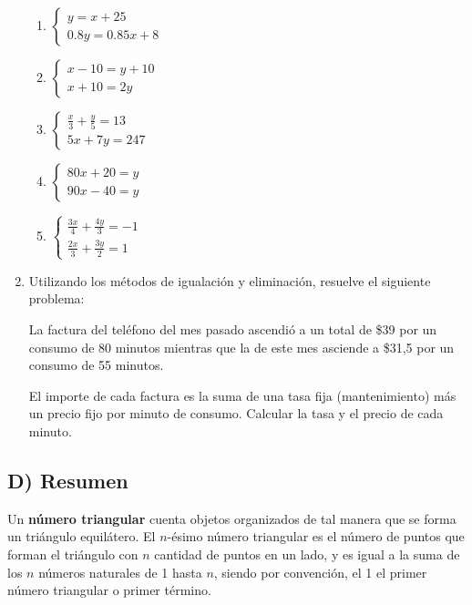 \documentclass[12pt,a4paper]{article}
\begin{document}
\begin{enumerate}
\begin{enumerate}[label=\alph*.]
        \item $\begin{cases} y = x + 25 \\ 0.8y = 0.85x + 8 \end{cases}$

        \item $\begin{cases} x - 10 = y + 10 \\ x + 10 = 2y \end{cases}$

        \item $\begin{cases} \frac{x}{3} + \frac{y}{5} = 13 \\ 5x + 7y = 247 \end{cases}$

        \item $\begin{cases} 80x + 20 = y \\ 90x - 40 = y \end{cases}$

        \item $\begin{cases} \frac{3x}{4} + \frac{4y}{3} = -1 \\ \frac{2x}{3} + \frac{3y}{2} = 1 \end{cases}$
    \end{enumerate}

    \item Utilizando los métodos de igualación y eliminación, resuelve el siguiente problema:

    La factura del teléfono del mes pasado ascendió a un total de \$39 por un consumo de 80 minutos mientras que la de este mes asciende a \$31,5 por un consumo de 55 minutos.

    El importe de cada factura es la suma de una tasa fija (mantenimiento) más un precio fijo por minuto de consumo. Calcular la tasa y el precio de cada minuto.
\end{enumerate}

\vspace{1.5cm}

\subsection*{D) Resumen}

Un \textbf{número triangular} cuenta objetos organizados de tal manera que se forma un triángulo equilátero. El $n$-ésimo número triangular es el número de puntos que forman el triángulo con $n$ cantidad de puntos en un lado, y es igual a la suma de los $n$ números naturales de 1 hasta $n$, siendo por convención, el 1 el primer número triangular o primer término.
\end{document}
